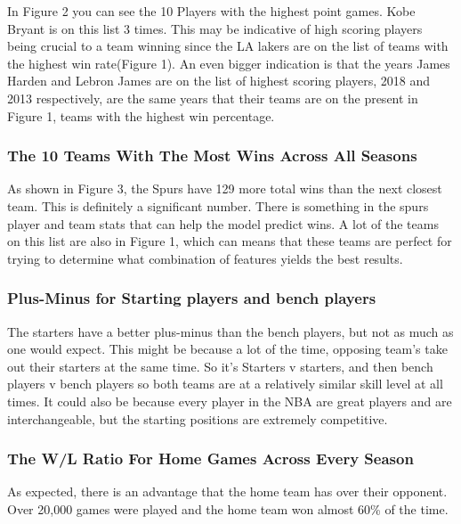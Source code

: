 \documentclass[11pt]{article}
\begin{document}
\flushleft In Figure 2 you can see the 10 Players with the highest point games. Kobe Bryant is on this list 3 times. This may be indicative of high scoring players being crucial to a team winning since the LA lakers are on the list of teams with the highest win rate(Figure 1). An even bigger indication is that the years James Harden and Lebron James are on the list of highest scoring players, 2018 and 2013 respectively, are the same years that their teams are on the present in Figure 1, teams with the highest win percentage.
    
\medskip
    
\subsubsection{The 10 Teams With The Most Wins Across All Seasons}

As shown in Figure 3, the Spurs have 129 more total wins than the next closest team. This is definitely a significant number. There is something in the spurs player and team stats that can help the model predict wins. A lot of the teams on this list are also in Figure 1, which can means that these teams are perfect for trying to determine what combination of features yields the best results. 

   
    
\subsubsection{Plus-Minus for Starting players and bench players}

The starters have a better plus-minus than the bench players, but not as
much as one would expect. This might be because a lot of the time, opposing
team's take out their starters at the same time. So it's Starters v
starters, and then bench players v bench players so both teams are at a
relatively similar skill level at all times. It could also be because every player in the NBA are great players and are interchangeable, but the starting positions are extremely competitive.


\subsubsection{The W/L Ratio For Home Games Across Every Season}

As expected, there is an advantage that the home team has over their opponent. Over 20,000 games were played and the home team won almost 60\% of the time. 
    
\end{document}
